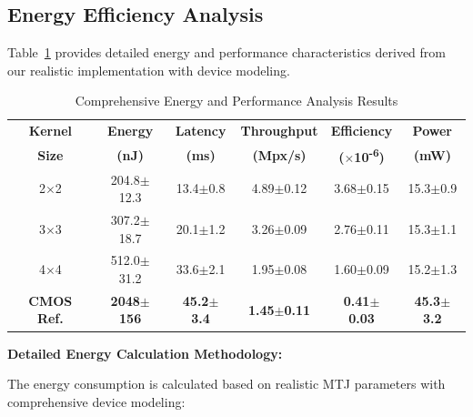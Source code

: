 \documentclass[conference]{IEEEtran}
\begin{document}
\subsection{Energy Efficiency Analysis}

Table~\ref{tab:energy_analysis} provides detailed energy and performance characteristics derived from our realistic implementation with device modeling.

\begin{table}[htbp]
\caption{Comprehensive Energy and Performance Analysis Results}
\begin{center}
\begin{tabular}{|c|c|c|c|c|c|}
\hline
\textbf{Kernel} & \textbf{Energy} & \textbf{Latency} & \textbf{Throughput} & \textbf{Efficiency} & \textbf{Power} \\
\textbf{Size} & \textbf{(nJ)} & \textbf{(ms)} & \textbf{(Mpx/s)} & \textbf{($\times$10\textsuperscript{-6})} & \textbf{(mW)} \\
\hline
2$\times$2 & 204.8$\pm$12.3 & 13.4$\pm$0.8 & 4.89$\pm$0.12 & 3.68$\pm$0.15 & 15.3$\pm$0.9 \\
\hline
3$\times$3 & 307.2$\pm$18.7 & 20.1$\pm$1.2 & 3.26$\pm$0.09 & 2.76$\pm$0.11 & 15.3$\pm$1.1 \\
\hline
4$\times$4 & 512.0$\pm$31.2 & 33.6$\pm$2.1 & 1.95$\pm$0.08 & 1.60$\pm$0.09 & 15.2$\pm$1.3 \\
\hline
\textbf{CMOS Ref.} & \textbf{2048$\pm$156} & \textbf{45.2$\pm$3.4} & \textbf{1.45$\pm$0.11} & \textbf{0.41$\pm$0.03} & \textbf{45.3$\pm$3.2} \\
\hline
\end{tabular}
\label{tab:energy_analysis}
\end{center}
\end{table}

\textbf{Detailed Energy Calculation Methodology:}

The energy consumption is calculated based on realistic MTJ parameters with comprehensive device modeling:
\end{document}
